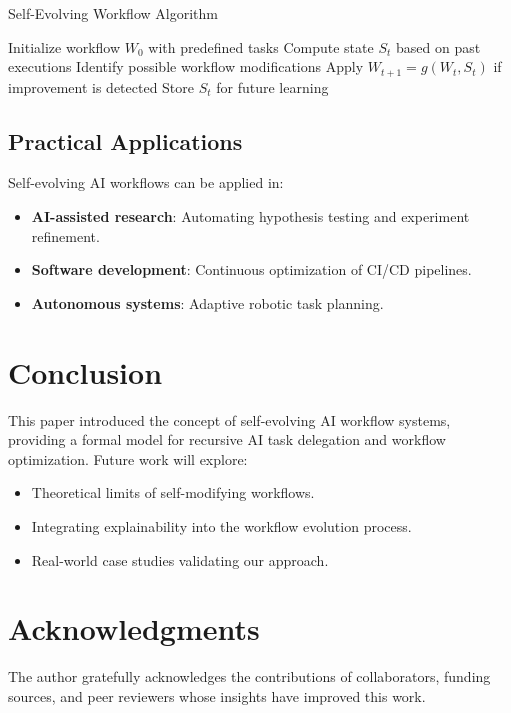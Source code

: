 \documentclass{article}
\begin{document}
\begin{algorithm}
\caption{Self-Evolving Workflow Algorithm}
\begin{algorithmic}
    \STATE Initialize workflow $W_0$ with predefined tasks
        \STATE Compute state $S_t$ based on past executions
        \STATE Identify possible workflow modifications
        \STATE Apply $W_{t+1} = g(W_t, S_t)$ if improvement is detected
        \STATE Store $S_t$ for future learning
    \ENDFOR
\end{algorithmic}
\end{algorithm}

\subsection{Practical Applications}

Self-evolving AI workflows can be applied in:
\begin{itemize}
    \item \textbf{AI-assisted research}: Automating hypothesis testing and experiment refinement.
    \item \textbf{Software development}: Continuous optimization of CI/CD pipelines.
    \item \textbf{Autonomous systems}: Adaptive robotic task planning.
\end{itemize}

\section{Conclusion}

This paper introduced the concept of self-evolving AI workflow systems, providing a formal model for recursive AI task delegation and workflow optimization. Future work will explore:
\begin{itemize}
    \item Theoretical limits of self-modifying workflows.
    \item Integrating explainability into the workflow evolution process.
    \item Real-world case studies validating our approach.
\end{itemize}

\section*{Acknowledgments}
The author gratefully acknowledges the contributions of collaborators, funding sources, and peer reviewers whose insights have improved this work.



\end{document}
